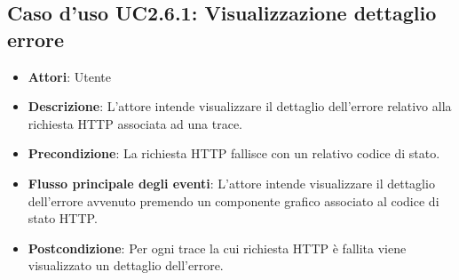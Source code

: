 \subsection{Caso d'uso UC2.6.1: Visualizzazione dettaglio errore}
\begin{itemize}
\item \textbf{Attori}: Utente
\item \textbf{Descrizione}: L'attore intende visualizzare il dettaglio dell'errore relativo alla richiesta HTTP associata ad una trace.
\item \textbf{Precondizione}: La richiesta HTTP fallisce con un relativo codice di stato.
\item \textbf{Flusso principale degli eventi}: L'attore intende visualizzare il dettaglio dell'errore avvenuto premendo un componente grafico associato al codice di stato HTTP.
\item \textbf{Postcondizione}: Per ogni trace la cui richiesta HTTP è fallita viene visualizzato un dettaglio dell'errore.
\end{itemize}
